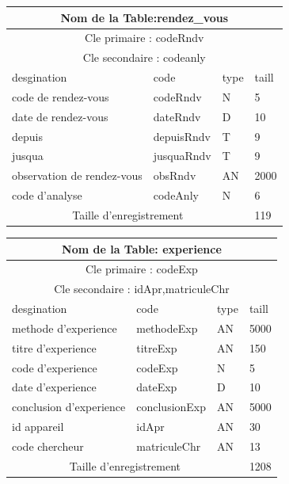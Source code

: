 \vspace{2cm}

\begin{tabular}{ |p{5cm}||p{4cm}|p{3cm}|p{3cm}|  }
    \hline
    \multicolumn{4}{|c|}{Nom de la Table:rendez\_vous } \\
    \hline
    \multicolumn{4}{|c|}{Cle primaire : codeRndv} \\
    \hline
    \multicolumn{4}{|c|}{Cle secondaire : codeanly } \\
    \hline
    \hline
    desgination&code&type&taill \\
    \hline
    code de rendez-vous&codeRndv&N&5 \\
    date de rendez-vous&dateRndv&D&10 \\
    depuis&depuisRndv&T&9 \\
    jusqua&jusquaRndv&T&9 \\
    observation de rendez-vous&obsRndv&AN&2000 \\
    code d'analyse&codeAnly&N&6 \\
    \hline
    \hline
    \multicolumn{3}{|c|}{Taille d’enregistrement} & 119\\
    \hline
\end{tabular}

\vspace{2cm}

\begin{tabular}{ |p{5cm}||p{4cm}|p{3cm}|p{3cm}|  }
    \hline
    \multicolumn{4}{|c|}{Nom de la Table: experience} \\
    \hline
    \multicolumn{4}{|c|}{Cle primaire : codeExp} \\
    \hline
    \multicolumn{4}{|c|}{Cle secondaire : idApr,matriculeChr } \\
    \hline
    \hline
    desgination&code&type&taill \\
    \hline
    
    methode d'experience&methodeExp&AN&5000 \\
    titre d'experience&titreExp&AN&150 \\
    code d'experience&codeExp&N&5 \\
    date d'experience&dateExp&D&10 \\
    conclusion d'experience&conclusionExp&AN&5000 \\
    id appareil&idApr&AN&30 \\
    code chercheur&matriculeChr&AN&13 \\
    \hline
    \hline
    \multicolumn{3}{|c|}{Taille d’enregistrement} & 1208\\
    \hline
\end{tabular}

